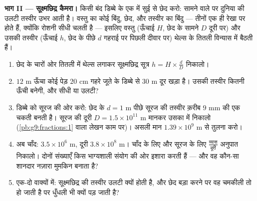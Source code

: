 \begin{problem}
\medskip
\noindent\textbf{भाग II --- सूक्ष्मछिद्र कैमरा।}
किसी बंद डिब्बे के एक  में सुई से छेद करो: सामने वाले  पर
दुनिया की उलटी तस्वीर उभर आती है। वस्तु का कोई बिंदु, छेद, और तस्वीर
का बिंदु --- तीनों एक ही रेखा पर होते हैं, क्योंकि रोशनी सीधी चलती
है --- इसलिए वस्तु (ऊँचाई $H$, छेद के सामने $D$ दूरी पर) और उसकी
तस्वीर (ऊँचाई $h$, छेद के पीछे $d$ गहराई पर पिछली दीवार पर) थेल्स के
तितली विन्यास में बैठती हैं।
\begin{enumerate}[resume]
  \item छेद के चारों ओर तितली में थेल्स लगाकर सूक्ष्मछिद्र सूत्र
        $h = H \times \frac dD$ निकालो।
  \item $12$ m ऊँचा कोई पेड़ $20$ cm गहरे जूते के डिब्बे से $30$ m
        दूर खड़ा है। उसकी तस्वीर कितनी ऊँची बनेगी, और सीधी या उलटी?
  \item डिब्बे को सूरज की ओर करो: छेद के $d = 1$ m पीछे सूरज की
        तस्वीर क़रीब $9$ mm  की एक चकती बनती है। सूरज की दूरी
        $D = 1.5 \times 10^{11}$ m मानकर उसका  
        में निकालो (\cref{pb:g9:fractions:1} वाला लेखन काम पर)। असली
        मान $1.39 \times 10^9$ m से तुलना करो।
  \item अब चाँद:  $3.5 \times 10^6$ m, दूरी
        $3.8 \times 10^8$ m। चाँद के लिए और सूरज के लिए
        $\frac{\text{व्यास}}{\text{दूरी}}$ अनुपात निकालो। दोनों
        संख्याएँ किस भाग्यशाली संयोग की ओर इशारा करती हैं --- और वह
        कौन-सा शानदार नज़ारा मुमकिन बनाता है?
  \item एक-दो वाक्यों में: सूक्ष्मछिद्र की तस्वीर उलटी क्यों होती
        है, और छेद बड़ा करने पर वह चमकीली तो हो जाती है पर धुँधली
        भी क्यों पड़ जाती है?
\end{enumerate}


\end{problem}
